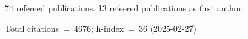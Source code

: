 74 refereed publications. 13 refeered publications as first author.

Total citations~=~4676; h-index~=~36 (2025-02-27)
